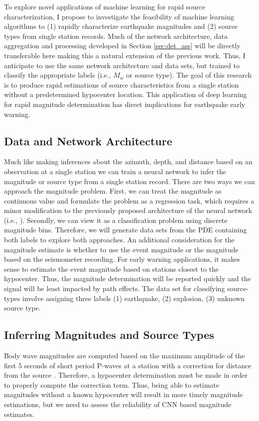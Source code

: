 \documentclass[12p]{article}
\begin{document}
To explore novel applications of machine learning for rapid source characterization, I propose to investigate the
feasibility of machine learning algorithms to (1) rapidly characterize earthquake magnitudes and (2) source types from
single station records. Much of the network architecture, data aggregation and processing developed in Section
\ref{sec:det_ass} will be directly transferable here making this a natural extension of the previous work. Thus, I
anticipate to use the same network architecture and data sets, but trained to classify the appropriate labels (i.e.,
$M_w$ or source type). The goal of this research is to produce rapid estimations of source characteristics from a
single station without a predetermined hypocenter location. This application of deep learning for rapid magnitude
determination has direct implications for earthquake early warning.

\subsection{Data and Network Architecture}
Much like making inferences about the azimuth, depth, and distance based on an observation at a single station we can
train a neural network to infer the magnitude or source type from a single station record. There are two ways we can
approach the magnitude problem. First, we can treat the magnitude as continuous value and formulate the problem as a
regression task, which requires a minor modification to the previously proposed architecture of the neural network
(i.e., \citet{Ross2018a, Ross2018b}). Secondly, we can view it as a classification problem using discrete magnitude
bins. Therefore, we will generate data sets from the PDE containing both labels to explore both approaches. An
additional consideration for the magnitude estimate is whether to use the event magnitude or the magnitude based on the
seismometer recording. For early warning applications, it makes sense to estimate the event magnitude based on stations
closest to the hypocenter. Thus, the magnitude determination will be reported quickly and the signal will be least
impacted by path effects. The data set for classifying source-types involve assigning three labels (1) earthquake, (2)
explosion, (3) unknown source type.

\subsection{Inferring Magnitudes and Source Types}
Body wave magnitudes are computed based on the maximum amplitude of the first 5 seconds of short period P-waves at a
station with a correction for distance from the source \citep{Gutenberg1945, Scordillis2006}. Therefore, a hypocenter
determination must be made in order to properly compute the correction term. Thus, being able to estimate magnitudes
without a known hypocenter will result in more timely magnitude estimations, but we need to assess the reliability of
CNN based magnitude estimates.
\end{document}
